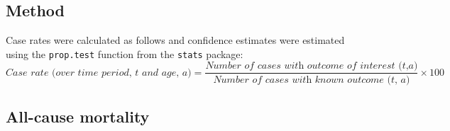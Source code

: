 \documentclass[11pt,twoside]{bristolthesis}
\begin{document}
  \hypertarget{method-2}{%
  \subsection{Method}\label{method-2}}
  
  Case rates were calculated as follows and confidence estimates were estimated using the \texttt{prop.test} function from the \texttt{stats} package:
  \begin{equation} 
    \textit{Case rate (over time period, t and age, a)} = \frac{\textit{Number of cases with outcome of interest (t,a)}}{\textit{Number of cases with known outcome (t, a)}} \times 100
    \label{eq:CaseRateEq}
  \end{equation}
  \hypertarget{all-cause-mortality}{%
  \subsection{All-cause mortality}\label{all-cause-mortality}}
  
\end{document}
